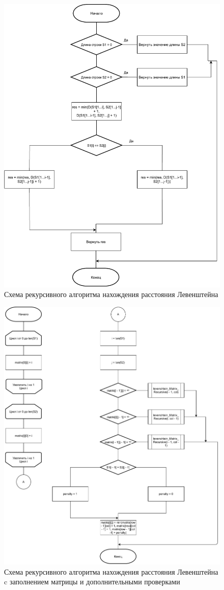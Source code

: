\documentclass[12pt,a4paper,oneside]{report}
\begin{document}
\begin{figure}[H]
	\centering
	\includegraphics[width=0.8\linewidth]{levenshtein_recursive}
	\caption{Схема рекурсивного алгоритма нахождения расстояния Левенштейна}
\end{figure}

\begin{figure}[H]
	\centering
	\includegraphics[width=0.8\linewidth]{levenshtein_matrix_recursive}
	\caption{Схема рекурсивного алгоритма нахождения расстояния Левенштейна c заполнением матрицы и дополнительными проверками}
\end{figure}
\end{document}
